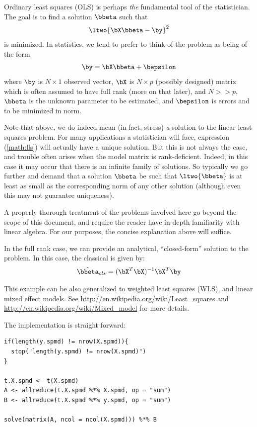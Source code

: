 Ordinary least squares (OLS)
is perhaps \emph{the} fundamental tool of the statistician. The goal is to
find a solution $\bbeta$ such that
\begin{align}
\ltwo{ \bX\bbeta - \by }^2 \label{math:lls}
\end{align}
is minimized. In statistics, we tend to prefer to think of the problem as
being of the form
\begin{align}
\by = \bX\bbeta + \bepsilon \label{math:statslls}
\end{align}
where $\by$ is $N\times 1$ observed vector,
$\bX$ is $N\times p$ (possibly designed) matrix which is often assumed to
have full rank (more on that later), and $N >> p$,
$\bbeta$ is the unknown parameter to be estimated,
and $\bepsilon$ is errors and to be minimized in norm.

Note that above, we do indeed mean (in fact, stress) \emph{a} solution
to the linear least squares problem. For many applications a statistician
will face, expression (\ref{math:lls}) will actually have a unique
solution. But this is not always the case, and trouble often arises when
the model matrix is rank-deficient. Indeed, in this case it may occur
that there is an infinite family of solutions. So typically we go further
and demand that a solution $\bbeta$ be such that $\ltwo{\bbeta}$ is at
least as small as the corresponding norm of any other solution (although
even this may not guarantee uniqueness).

A properly thorough treatment of the problems involved here go beyond the
scope of this document, and require the reader have in-depth familiarity
with linear algebra. For our purposes, the concise explanation above will
suffice.  



In the full rank case, we can provide an analytical, ``closed-form''
solution to the problem.  In this case, the classical
is given by:
\begin{align}
 \hat{\bbeta}_{ols} = (\bX^T\bX)^{-1}\bX^T\by \label{math:ols}
\end{align}
 
This example can be also generalized to weighted least squares (WLS),
and linear mixed effect models.
See \url{http://en.wikipedia.org/wiki/Least_squares} and
\url{http://en.wikipedia.org/wiki/Mixed_model} for more details.

The implementation is straight forward:
\begin{lstlisting}[language=rr,title=R Code]
if(length(y.spmd) != nrow(X.spmd)){
  stop("length(y.spmd) != nrow(X.spmd)")
}

t.X.spmd <- t(X.spmd)
A <- allreduce(t.X.spmd %*% X.spmd, op = "sum")
B <- allreduce(t.X.spmd %*% y.spmd, op = "sum")

solve(matrix(A, ncol = ncol(X.spmd))) %*% B
\end{lstlisting}

